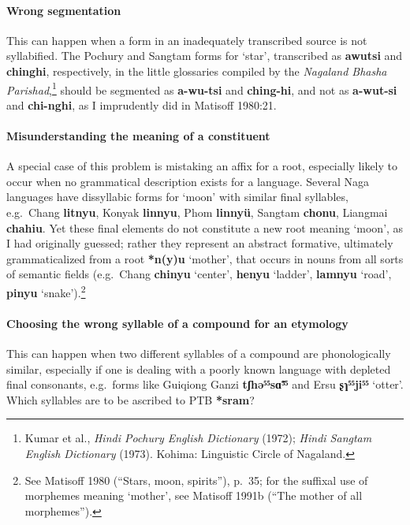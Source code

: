 \paragraph{Wrong segmentation}
This can happen when a form in an inadequately transcribed source is not
syllabified.  The Pochury and Sangtam forms for ‘star’, transcribed as \textbf{awutsi}
and \textbf{chinghi}, respectively, in the little glossaries compiled by the
\textit{Nagaland
Bhasha Parishad},\footnote{Kumar et al., \textit{Hindi Pochury English Dictionary} (1972);
\textit{Hindi
Sangtam English Dictionary} (1973). Kohima: Linguistic Circle of Nagaland.}
 should
be segmented as \textbf{a-wu-tsi} and \textbf{ching-hi},
and not as \textbf{a-wut-si} and \textbf{chi-nghi}, as I
imprudently did in Matisoff 1980:21.


\paragraph{Misunderstanding the meaning of a constituent}
A special case of this problem is mistaking an affix for a root, especially
likely to occur when no grammatical description exists for a language. Several
Naga languages have dissyllabic forms for ‘moon’ with similar final syllables,
e.g.\ Chang \textbf{litnyu}, Konyak \textbf{linnyu},
Phom \textbf{linnyü}, Sangtam \textbf{chonu}, Liangmai \textbf{chahiu}.
Yet these final elements do not constitute a new root meaning ‘moon’, as I had
originally guessed; rather they represent an abstract formative, ultimately
grammaticalized from a root \textbf{*n(y)u} ‘mother’, that occurs in nouns from all sorts
of semantic fields (e.g.\ Chang \textbf{chinyu} ‘center’,
\textbf{henyu} ‘ladder’, \textbf{lamnyu} ‘road’,
\textbf{pinyu} ‘snake’).\footnote{See Matisoff 1980 (“Stars, moon, spirits”), p.\ 35;
for the
suffixal use of morphemes meaning ‘mother’, see Matisoff 1991b (“The mother of all
morphemes”).}


\paragraph{Choosing the wrong syllable of a compound for an etymology}
This can happen when two different syllables of a compound are phonologically
similar, especially if one is dealing with a poorly known language with depleted
final consonants, e.g.\ forms like Guiqiong Ganzi \textbf{tʃhə⁵⁵sɑ̃⁵⁵}
and Ersu \textbf{ʂɿ⁵⁵ji⁵⁵} ‘otter’.
Which syllables are to be ascribed to PTB \textbf{*sram}? 

